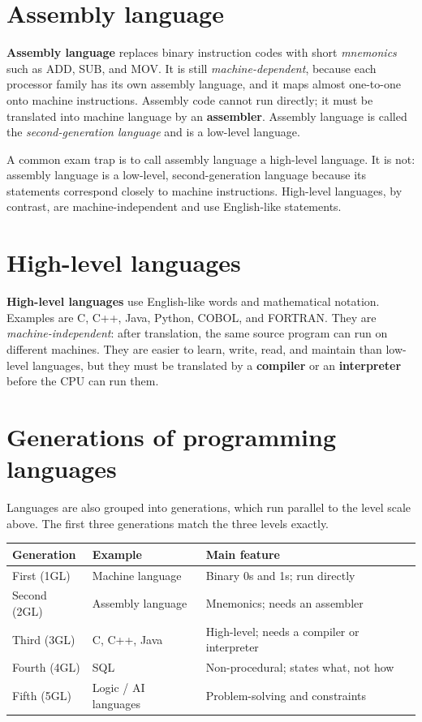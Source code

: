 \documentclass[11pt]{article}
\begin{document}
\section{Assembly language}
\textbf{Assembly language} replaces binary instruction codes with short
\emph{mnemonics} such as ADD, SUB, and MOV. It is still
\emph{machine-dependent}, because each processor family has its own assembly
language, and it maps almost one-to-one onto machine instructions. Assembly
code cannot run directly; it must be translated into machine language by an
\textbf{assembler}. Assembly language is called the \emph{second-generation
language} and is a low-level language.

A common exam trap is to call assembly language a high-level language. It is
not: assembly language is a low-level, second-generation language because its
statements correspond closely to machine instructions. High-level languages,
by contrast, are machine-independent and use English-like statements.

\section{High-level languages}
\textbf{High-level languages} use English-like words and mathematical
notation. Examples are C, C++, Java, Python, COBOL, and FORTRAN. They are
\emph{machine-independent}: after translation, the same source program can run
on different machines. They are easier to learn, write, read, and maintain
than low-level languages, but they must be translated by a \textbf{compiler}
or an \textbf{interpreter} before the CPU can run them.

\section{Generations of programming languages}
Languages are also grouped into generations, which run parallel to the level
scale above. The first three generations match the three levels exactly.

\begin{center}
\begin{tabular}{p{}p{}p{}}
\toprule
\textbf{Generation} & \textbf{Example} & \textbf{Main feature} \\
\midrule
First (1GL) & Machine language & Binary 0s and 1s; run directly \\
Second (2GL) & Assembly language & Mnemonics; needs an assembler \\
Third (3GL) & C, C++, Java & High-level; needs a compiler or interpreter \\
Fourth (4GL) & SQL & Non-procedural; states what, not how \\
Fifth (5GL) & Logic / AI languages & Problem-solving and constraints \\
\bottomrule
\end{tabular}
\end{center}
\end{document}
